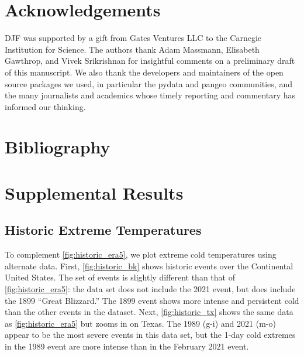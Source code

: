 \documentclass[12pt]{iopart}
\begin{document}
\section*{Acknowledgements}

DJF was supported by a gift from Gates Ventures LLC to the Carnegie Institution for Science.
The authors thank Adam Massmann, Elisabeth Gawthrop, and Vivek Srikrishnan for insightful comments on a preliminary draft of this manuscript.
We also thank the developers and maintainers of the open source packages we used, in particular the pydata and pangeo communities, and the many journalists and academics whose timely reporting and commentary has informed our thinking.

\section*{Bibliography}



\clearpage
\section{Supplemental Results}
\renewcommand{\thefigure}{S\arabic{figure}}
\setcounter{figure}{0}

\subsection{Historic Extreme Temperatures}

To complement \cref{fig:historic_era5}, we plot extreme cold temperatures using alternate data.
First, \cref{fig:historic_bk} shows historic events over the Continental United States.
The set of events is slightly different than that of \cref{fig:historic_era5}: the data set does not include the 2021 event, but does include the 1899 ``Great Blizzard.''
The 1899 event shows more intense and persistent cold than the other events in the dataset.
Next, \cref{fig:historic_tx} shows the same data as \cref{fig:historic_era5} but zooms in on Texas.
The 1989 (g-i) and 2021 (m-o) appear to be the most severe events in this data set, but the 1-day cold extremes in the 1989 event are more intense than in the February 2021 event.
\end{document}
